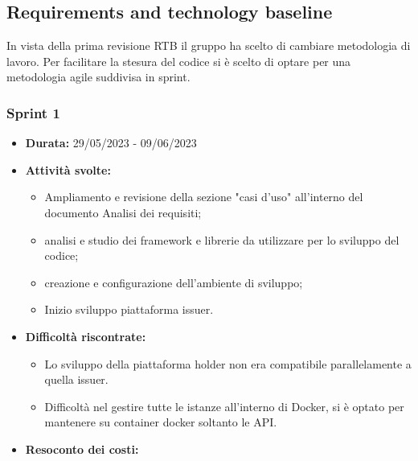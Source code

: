 \subsection{Requirements and technology baseline}
In vista della prima revisione RTB il gruppo ha scelto di cambiare metodologia di lavoro. Per facilitare la stesura del codice si è scelto di optare per una metodologia agile suddivisa in sprint.


\subsubsection{Sprint 1}
\begin{itemize}
\item \textbf{Durata:} 29/05/2023 - 09/06/2023 
\item \textbf{Attività svolte:}
\begin{itemize}
    \item Ampliamento e revisione della sezione "casi d'uso" all'interno del documento Analisi dei requisiti;
    \item analisi e studio dei framework e librerie da utilizzare per lo sviluppo del codice;
    \item creazione e configurazione dell'ambiente di sviluppo;
    \item Inizio sviluppo piattaforma issuer.
\end{itemize}
\item \textbf{Difficoltà riscontrate:}
\begin{itemize}
    \item Lo sviluppo della piattaforma holder non era compatibile parallelamente a quella issuer. 
    \item Difficoltà nel gestire tutte le istanze all'interno di Docker\glo, si è optato per mantenere su container docker soltanto le API.
\end{itemize}
\item \textbf{Resoconto dei costi:}
\end{itemize}

